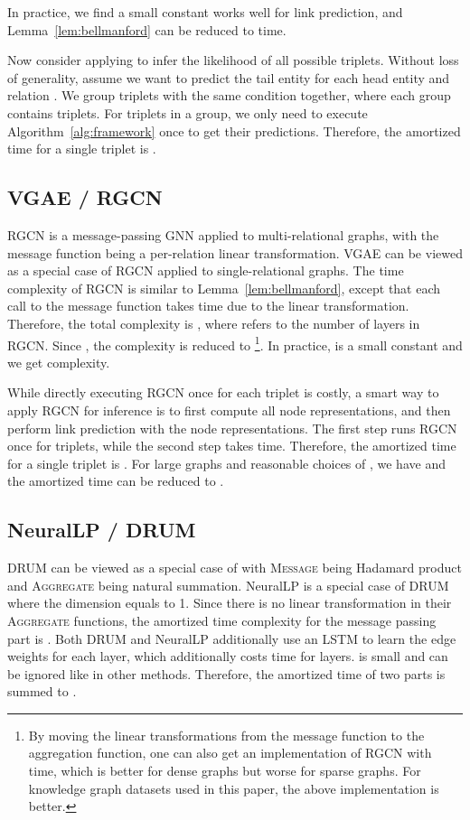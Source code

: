 In practice, we find a small constant  works well for link prediction, and Lemma~\ref{lem:bellmanford} can be reduced to  time.

Now consider applying \method to infer the likelihood of all possible triplets. Without loss of generality, assume we want to predict the tail entity for each head entity and relation . We group triplets with the same condition  together, where each group contains  triplets. For triplets in a group, we only need to execute Algorithm~\ref{alg:framework} once to get their predictions. Therefore, the amortized time for a single triplet is .

\subsection{VGAE / RGCN}
RGCN is a message-passing GNN applied to multi-relational graphs, with the message function being a per-relation linear transformation. VGAE can be viewed as a special case of RGCN applied to single-relational graphs. The time complexity of RGCN is similar to Lemma~\ref{lem:bellmanford}, except that each call to the message function takes  time due to the linear transformation. Therefore, the total complexity is , where  refers to the number of layers in RGCN. Since , the complexity is reduced to \footnote{By moving the linear transformations from the message function to the aggregation function, one can also get an implementation of RGCN with  time, which is better for dense graphs but worse for sparse graphs. For knowledge graph datasets used in this paper, the above  implementation is better.}. In practice,  is a small constant and we get  complexity.

While directly executing RGCN once for each triplet is costly, a smart way to apply RGCN for inference is to first compute all node representations, and then perform link prediction with the node representations. The first step runs RGCN once for  triplets, while the second step takes  time. Therefore, the amortized time for a single triplet is . For large graphs and reasonable choices of , we have  and the amortized time can be reduced to .

\subsection{NeuralLP / DRUM}
DRUM can be viewed as a special case of \method with \textsc{Message} being Hadamard product and \textsc{Aggregate} being natural summation. NeuralLP is a special case of DRUM where the dimension  equals to 1. Since there is no linear transformation in their \textsc{Aggregate} functions, the amortized time complexity for the message passing part is . Both DRUM and NeuralLP additionally use an LSTM to learn the edge weights for each layer, which additionally costs  time for  layers.  is small and can be ignored like in other methods. Therefore, the amortized time of two parts is summed to .

